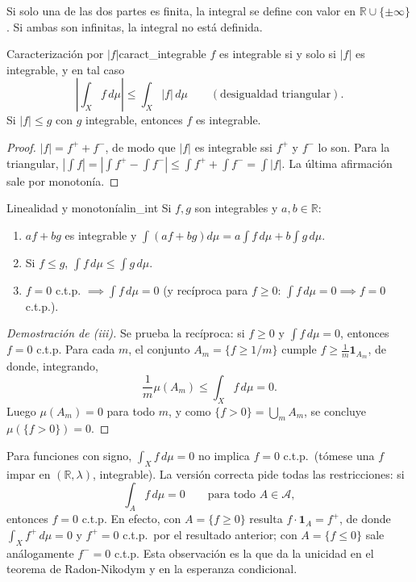 \documentclass[11pt, a4paper]{article}
\begin{document}
\obs Si solo una de las dos partes es finita, la integral se define con valor en $\mathbb{R} \cup
\{\pm\infty\}$. Si ambas son infinitas, la integral no está definida.

\begin{proposicion}{Caracterización por $|f|$}{caract_integrable}
$f$ es integrable si y solo si $|f|$ es integrable, y en tal caso
$$ \left| \int_X f \, d\mu \right| \le \int_X |f| \, d\mu \qquad (\text{desigualdad triangular}). $$
Si $|f| \le g$ con $g$ integrable, entonces $f$ es integrable.
\end{proposicion}

\begin{proof}
$|f| = f^+ + f^-$, de modo que $|f|$ es integrable ssi $f^+$ y $f^-$ lo son. Para la triangular,
$|\int f| = |\int f^+ - \int f^-| \le \int f^+ + \int f^- = \int |f|$. La última afirmación
sale por monotonía.
\end{proof}

\begin{proposicion}{Linealidad y monotonía}{lin_int}
Si $f, g$ son integrables y $a, b \in \mathbb{R}$:
\begin{enumerate}
    \item $af + bg$ es integrable y $\int (af + bg) d\mu = a \int f \, d\mu + b \int g \, d\mu$.
    \item Si $f \le g$, $\int f \, d\mu \le \int g \, d\mu$.
    \item $f = 0$ c.t.p. $\implies \int f \, d\mu = 0$ (y recíproca para $f \ge 0$:
    $\int f \, d\mu = 0 \implies f = 0$ c.t.p.).
\end{enumerate}
\end{proposicion}

\begin{proof}[Demostración de (iii)]
Se prueba la recíproca: si $f \ge 0$ y $\int f \, d\mu = 0$, entonces $f = 0$ c.t.p. Para cada $m$,
el conjunto $A_m = \{f \ge 1/m\}$ cumple $f \ge \tfrac{1}{m} \mathbf{1}_{A_m}$, de donde, integrando,
$$ \frac{1}{m} \mu(A_m) \le \int_X f \, d\mu = 0. $$
Luego $\mu(A_m) = 0$ para todo $m$, y como $\{f > 0\} = \bigcup_m A_m$, se concluye
$\mu(\{f > 0\}) = 0$.
\end{proof}

\obs Para funciones con signo, $\int_X f \, d\mu = 0$ no implica $f = 0$ c.t.p.\ (tómese una
$f$ impar en $(\mathbb{R}, \lambda)$, integrable). La versión correcta pide todas las
restricciones: si
$$ \int_A f \, d\mu = 0 \qquad \text{para todo } A \in \mathcal{A}, $$
entonces $f = 0$ c.t.p. En efecto, con $A = \{f \ge 0\}$ resulta $f \cdot \mathbf{1}_A = f^+$,
de donde $\int_X f^+ \, d\mu = 0$ y $f^+ = 0$ c.t.p.\ por el resultado anterior; con
$A = \{f \le 0\}$ sale análogamente $f^- = 0$ c.t.p. Esta observación es la que da la
unicidad en el teorema de Radon-Nikodym y en la esperanza condicional.
\end{document}
